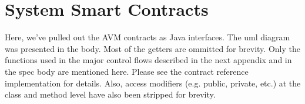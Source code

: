

\section{System Smart Contracts}
\label{appendix:contract}

Here, we've pulled out the AVM contracts as Java interfaces. The uml diagram was presented in the body. Most of the getters are ommitted for brevity. Only the functions used in the major control flows described in the next appendix and in the spec body are mentioned here. Please see the contract reference implementation for details. Also, access modifiers (e.g. public, private, etc.) at the class and method level have also been stripped for brevity.

